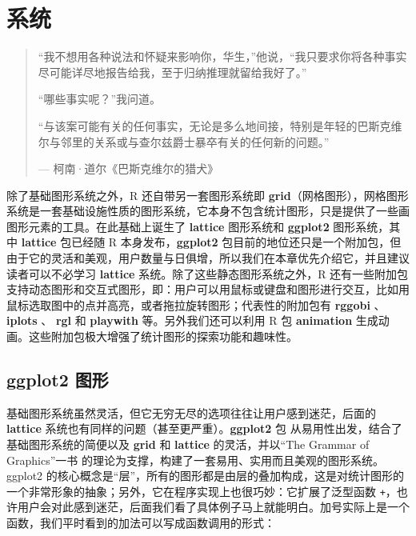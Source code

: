 \documentclass[
  b5paper,
  UTF8,twoside]{book}
\begin{document}
\chapter{系统}\label{chap:system}

\begin{quote}
``我不想用各种说法和怀疑来影响你，华生，''他说，``我只要求你将各种事实尽可能详尽地报告给我，至于归纳推理就留给我好了。''

``哪些事实呢？''我问道。

``与该案可能有关的任何事实，无论是多么地间接，特别是年轻的巴斯克维尔与邻里的关系或与查尔兹爵士暴卒有关的任何新的问题。''

\hspace*{\fill} --- 柯南·道尔《巴斯克维尔的猎犬》
\end{quote}

除了基础图形系统之外，R 还自带另一套图形系统即 \textbf{grid}（网格图形），网格图形系统是一套基础设施性质的图形系统，它本身不包含统计图形，只是提供了一些画图形元素的工具。在此基础上诞生了 \textbf{lattice} 图形系统和 \textbf{ggplot2} 图形系统，其中 \textbf{lattice} 包已经随 R 本身发布，\textbf{ggplot2} 包目前的地位还只是一个附加包，但由于它的灵活和美观，用户数量与日俱增，所以我们在本章优先介绍它，并且建议读者可以不必学习 \textbf{lattice} 系统。除了这些静态图形系统之外，R 还有一些附加包支持动态图形和交互式图形，即：用户可以用鼠标或键盘和图形进行交互，比如用鼠标选取图中的点并高亮，或者拖拉旋转图形；代表性的附加包有 \textbf{rggobi} 、 \textbf{iplots} 、 \textbf{rgl} 和 \textbf{playwith} 等。另外我们还可以利用 R 包 \textbf{animation} 生成动画。这些附加包极大增强了统计图形的探索功能和趣味性。

\section{ggplot2 图形}\label{sec:ggplot2}

基础图形系统虽然灵活，但它无穷无尽的选项往往让用户感到迷茫，后面的 \textbf{lattice} 系统也有同样的问题（甚至更严重）。\textbf{ggplot2} 包 \citep{ggplot2} 从易用性出发，结合了基础图形系统的简便以及 \textbf{grid} 和 \textbf{lattice} 的灵活，并以``The Grammar of Graphics''一书 \citep{Wilkinson05} 的理论为支撑，构建了一套易用、实用而且美观的图形系统。ggplot2 的核心概念是``层''，所有的图形都是由层的叠加构成，这是对统计图形的一个非常形象的抽象；另外，它在程序实现上也很巧妙：它扩展了泛型函数 \texttt{+}，也许用户会对此感到迷茫，后面我们看了具体例子马上就能明白。加号实际上是一个函数，我们平时看到的加法可以写成函数调用的形式：
\end{document}

